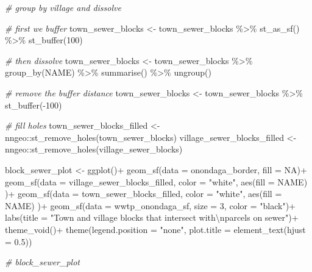 \documentclass[
]{book}
\newenvironment{Shaded}{\begin{snugshade}}{\end{snugshade}}
\newcommand{\AttributeTok}[1]{\textcolor[rgb]{0.77,0.63,0.00}{#1}}
\newcommand{\CommentTok}[1]{\textcolor[rgb]{0.56,0.35,0.01}{\textit{#1}}}
\newcommand{\ConstantTok}[1]{\textcolor[rgb]{0.00,0.00,0.00}{#1}}
\newcommand{\DecValTok}[1]{\textcolor[rgb]{0.00,0.00,0.81}{#1}}
\newcommand{\FloatTok}[1]{\textcolor[rgb]{0.00,0.00,0.81}{#1}}
\newcommand{\FunctionTok}[1]{\textcolor[rgb]{0.00,0.00,0.00}{#1}}
\newcommand{\NormalTok}[1]{#1}
\newcommand{\OtherTok}[1]{\textcolor[rgb]{0.56,0.35,0.01}{#1}}
\newcommand{\SpecialCharTok}[1]{\textcolor[rgb]{0.00,0.00,0.00}{#1}}
\newcommand{\StringTok}[1]{\textcolor[rgb]{0.31,0.60,0.02}{#1}}
\begin{document}
\begin{Shaded}
\begin{Highlighting}[]
\CommentTok{\# group by village and dissolve}

\CommentTok{\# first we buffer}
\NormalTok{town\_sewer\_blocks }\OtherTok{\textless{}{-}}\NormalTok{ town\_sewer\_blocks }\SpecialCharTok{\%\textgreater{}\%}
  \FunctionTok{st\_as\_sf}\NormalTok{() }\SpecialCharTok{\%\textgreater{}\%}
  \FunctionTok{st\_buffer}\NormalTok{(}\DecValTok{100}\NormalTok{)}

\CommentTok{\# then dissolve}
\NormalTok{town\_sewer\_blocks }\OtherTok{\textless{}{-}}\NormalTok{ town\_sewer\_blocks }\SpecialCharTok{\%\textgreater{}\%} 
  \FunctionTok{group\_by}\NormalTok{(NAME) }\SpecialCharTok{\%\textgreater{}\%}
  \FunctionTok{summarise}\NormalTok{() }\SpecialCharTok{\%\textgreater{}\%}
  \FunctionTok{ungroup}\NormalTok{()}

\CommentTok{\# remove the buffer distance}
\NormalTok{town\_sewer\_blocks }\OtherTok{\textless{}{-}}\NormalTok{ town\_sewer\_blocks }\SpecialCharTok{\%\textgreater{}\%}
  \FunctionTok{st\_buffer}\NormalTok{(}\SpecialCharTok{{-}}\DecValTok{100}\NormalTok{)}

\CommentTok{\# fill holes}
\NormalTok{town\_sewer\_blocks\_filled }\OtherTok{\textless{}{-}}\NormalTok{ nngeo}\SpecialCharTok{::}\FunctionTok{st\_remove\_holes}\NormalTok{(town\_sewer\_blocks)}
\NormalTok{village\_sewer\_blocks\_filled }\OtherTok{\textless{}{-}}\NormalTok{ nngeo}\SpecialCharTok{::}\FunctionTok{st\_remove\_holes}\NormalTok{(village\_sewer\_blocks)}

\NormalTok{block\_sewer\_plot }\OtherTok{\textless{}{-}}
  \FunctionTok{ggplot}\NormalTok{()}\SpecialCharTok{+}
  \FunctionTok{geom\_sf}\NormalTok{(}\AttributeTok{data =}\NormalTok{ onondaga\_border, }\AttributeTok{fill =} \ConstantTok{NA}\NormalTok{)}\SpecialCharTok{+}
  \FunctionTok{geom\_sf}\NormalTok{(}\AttributeTok{data =}\NormalTok{ village\_sewer\_blocks\_filled, }\AttributeTok{color =} \StringTok{"white"}\NormalTok{,}
          \FunctionTok{aes}\NormalTok{(}\AttributeTok{fill =}\NormalTok{ NAME)}
\NormalTok{          )}\SpecialCharTok{+}
  \FunctionTok{geom\_sf}\NormalTok{(}\AttributeTok{data =}\NormalTok{ town\_sewer\_blocks\_filled, }\AttributeTok{color =} \StringTok{"white"}\NormalTok{,}
          \FunctionTok{aes}\NormalTok{(}\AttributeTok{fill =}\NormalTok{ NAME)}
\NormalTok{          )}\SpecialCharTok{+}
  \FunctionTok{geom\_sf}\NormalTok{(}\AttributeTok{data =}\NormalTok{ wwtp\_onondaga\_sf, }\AttributeTok{size =} \DecValTok{3}\NormalTok{, }\AttributeTok{color =} \StringTok{"black"}\NormalTok{)}\SpecialCharTok{+}
  \FunctionTok{labs}\NormalTok{(}\AttributeTok{title =} \StringTok{"Town and  village blocks that intersect with}\SpecialCharTok{\textbackslash{}n}\StringTok{parcels on sewer"}\NormalTok{)}\SpecialCharTok{+}
  \FunctionTok{theme\_void}\NormalTok{()}\SpecialCharTok{+}
  \FunctionTok{theme}\NormalTok{(}\AttributeTok{legend.position =} \StringTok{"none"}\NormalTok{,}
        \AttributeTok{plot.title =} \FunctionTok{element\_text}\NormalTok{(}\AttributeTok{hjust =} \FloatTok{0.5}\NormalTok{))}

\CommentTok{\# block\_sewer\_plot}
\end{Highlighting}
\end{Shaded}
\end{document}
